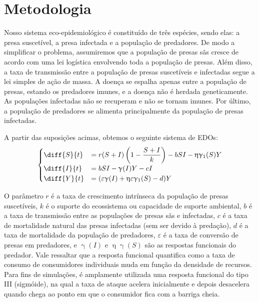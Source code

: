 \documentclass{article}
\begin{document}
\section{Metodologia}
Nosso sistema eco-epidemiológico é constituído de três espécies, sendo elas: a presa suscetível, a presa infectada e a população de predadores. De modo a simplificar o problema, assumiremos que a população de presas sãs cresce de acordo com uma lei logística envolvendo toda a população de presas. Além disso, a taxa de transmissão entre a população de presas suscetíveis e infectadas segue a lei simples de ação de massa. A doença se espalha apenas entre a população de presas, estando os predadores imunes, e a doença não é herdada geneticamente. As populações infectadas não se recuperam e não se tornam imunes. Por último, a população de predadores se alimenta principalmente da população de presas infectadas. 

A partir das suposições acimas, obtemos o seguinte sistema de EDOs:
\begin{equation*}
\begin{split}
    \begin{cases}
    \diff{S}{t} & = r(S+I) \left( 1 - \dfrac{S+I}{k} \right) - bSI - \upeta \upgamma_1(S)Y \\
    \diff{I}{t} & = bSI - \upgamma(I)Y - cI \\
    \diff{Y}{t} & = (\varepsilon \upgamma(I) + \upeta \varepsilon \upgamma_1(S) - d)Y
    \end{cases}
\end{split}
\end{equation*}

O parâmetro $r$ é a taxa de crescimento intrínseca da população de presas suscetíveis, $k$ é o suporte do ecossistema ou capacidade de suporte ambiental, $b$ é a taxa de transmissão entre as populações de presas sãs e infectadas, $c$ é a taxa de mortalidade natural das presas infectadas (sem ser devido à predação), $d$ é a taxa de mortalidade da população de predadores, $\varepsilon$ é a taxa de conversão de presas em predadores, e $\upgamma(I)$ e $\upeta \upgamma(S)$ são as respostas funcionais do predador. Vale ressaltar que a resposta funcional quantifica como a taxa de consumo de consumidores individuais muda em função da densidade de recursos. Para fins de simulações, é amplamente utilizada uma resposta funcional do tipo III (sigmóide), na qual a taxa de ataque acelera inicialmente e depois desacelera quando chega ao ponto em que o consumidor fica com a barriga cheia.
\end{document}
